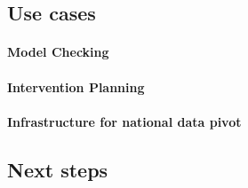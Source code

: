 \documentclass[12pt]{article}\usepackage[]{graphicx}\usepackage[]{color}
\begin{document}
\subsection{Use cases}
\paragraph{Model Checking}

\paragraph{Intervention Planning}

\paragraph{Infrastructure for national data pivot}

\subsection{Next steps}


%
\end{document}
